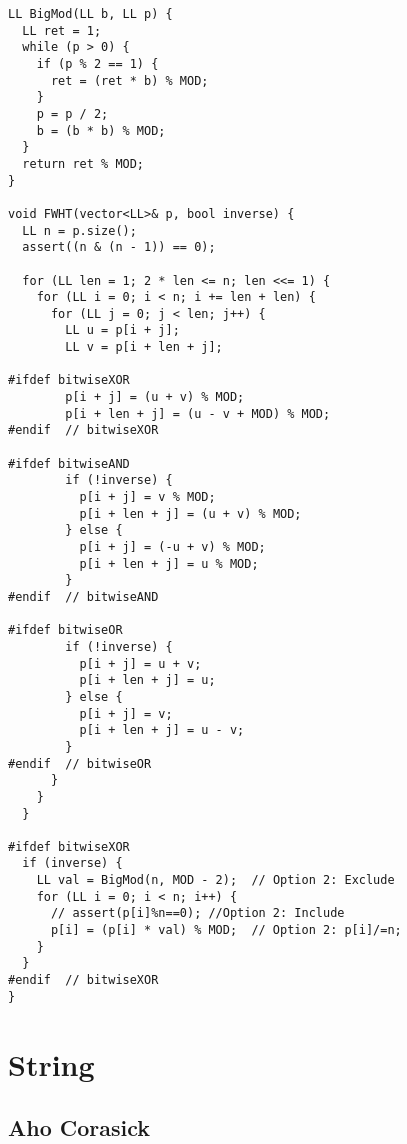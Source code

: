 \documentclass[FSZ,a4paper,onesided]{article}
\begin{document}
\begin{multicols*}{\COLS}
\begin{lstlisting}
LL BigMod(LL b, LL p) {
  LL ret = 1;
  while (p > 0) {
    if (p % 2 == 1) {
      ret = (ret * b) % MOD;
    }
    p = p / 2;
    b = (b * b) % MOD;
  }
  return ret % MOD;
}

void FWHT(vector<LL>& p, bool inverse) {
  LL n = p.size();
  assert((n & (n - 1)) == 0);

  for (LL len = 1; 2 * len <= n; len <<= 1) {
    for (LL i = 0; i < n; i += len + len) {
      for (LL j = 0; j < len; j++) {
        LL u = p[i + j];
        LL v = p[i + len + j];

#ifdef bitwiseXOR
        p[i + j] = (u + v) % MOD;
        p[i + len + j] = (u - v + MOD) % MOD;
#endif  // bitwiseXOR

#ifdef bitwiseAND
        if (!inverse) {
          p[i + j] = v % MOD;
          p[i + len + j] = (u + v) % MOD;
        } else {
          p[i + j] = (-u + v) % MOD;
          p[i + len + j] = u % MOD;
        }
#endif  // bitwiseAND

#ifdef bitwiseOR
        if (!inverse) {
          p[i + j] = u + v;
          p[i + len + j] = u;
        } else {
          p[i + j] = v;
          p[i + len + j] = u - v;
        }
#endif  // bitwiseOR
      }
    }
  }

#ifdef bitwiseXOR
  if (inverse) {
    LL val = BigMod(n, MOD - 2);  // Option 2: Exclude
    for (LL i = 0; i < n; i++) {
      // assert(p[i]%n==0); //Option 2: Include
      p[i] = (p[i] * val) % MOD;  // Option 2: p[i]/=n;
    }
  }
#endif  // bitwiseXOR
}
\end{lstlisting}
\section{String}
\subsection{Aho Corasick}
\begin{lstlisting}


\end{lstlisting}
\end{multicols*}
\end{document}
